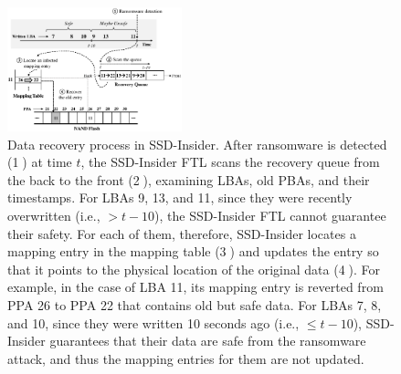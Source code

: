 \documentclass[conference]{IEEEtran}
\newcommand{\ours}{SSD-Insider}
\begin{document}
\begin{figure}
\centering
\includegraphics[width=0.45\textwidth]{fig/flash-fig3}
\caption{
Data recovery process in \ours{}.  After ransomware is detected
(\textcircled{1}) at time $t$, the \ours{} FTL scans the
recovery queue from the back to the front (\textcircled{2}),
examining LBAs, old PBAs, and their timestamps.  For LBAs 9, 13,
and 11, since they were recently overwritten (i.e., $> t-10$), the
\ours{} FTL cannot guarantee their safety.  For each of them,
therefore, \ours{} locates a mapping entry in the mapping table
(\textcircled{3}) and updates the entry so that it points to the
physical location of the original data (\textcircled{4}). For
example, in the case of LBA 11, its mapping entry is reverted from
PPA 26 to PPA 22 that contains old but safe data.  For LBAs 7, 8,
and 10, since they were written 10 seconds ago (i.e., $\leq t-10$),
\ours{} guarantees that their data are safe from the ransomware
attack, and thus the mapping entries for them are not updated.  
}
\label{fig:recovery}
\end{figure}
\end{document}
